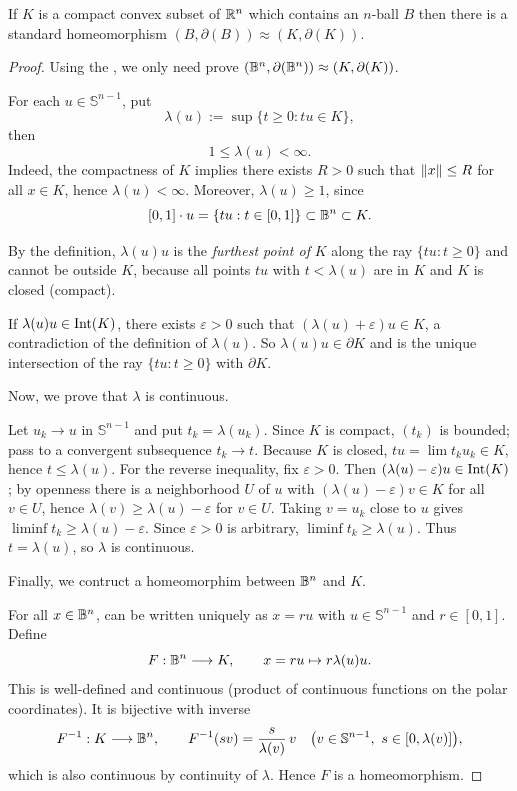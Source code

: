 \begin{proposition}\label{prop:convex-standard}
    If $K$ is a compact convex subset of $\mathbb{R}^n$ which contains an $n$-ball $B$ then there is a standard homeomorphism $(B,\partial(B)) \approx (K,\partial(K))$. 
\end{proposition}
\begin{proof}
    Using the , we only need prove $(\mathbb{B}^n,\partial(\mathbb{B}^n)) \approx (K,\partial(K))$.

    For each $u\in\mathbb{S}^{n-1}$, put
    \[
        \lambda(u) :=\sup\{ t\ge 0 : tu\in K\},
    \]
    then 
    \[1 \leq \lambda(u) < \infty.\] 
    Indeed, the compactness of $K$ implies there exists  $R>0$ such that $\lVert x\rVert\leq R$ for all $x\in K$, hence $\lambda(u) <\infty$. Moreover, $\lambda(u)\ge 1$, since
    \[[0,1]\cdot u = \{tu: t\in [0,1]\}\subset \mathbb{B}^n \subset K.\]

    By the definition, $\lambda(u)u$ is the \textit{furthest point of} $K$ along the ray $\{tu:t\geq 0\}$ and cannot be outside $K$, because all points $tu$ with $t < \lambda(u)$ are in $K$ and $K$ is closed (compact). 
    
    If $\lambda(u)u \in \operatorname{Int}(K)$, there exists $\varepsilon > 0$ such that $(\lambda(u) + \varepsilon)u \in K$, a contradiction of the definition of $\lambda(u)$. So $\lambda(u)u \in \partial K$ and is the unique intersection of the ray $\{t u:t\ge 0\}$ with $\partial K$.

    Now, we prove that $\lambda$ is continuous. 
    
    Let $u_k\to u$ in $\mathbb{S}^{n-1}$ and put $t_k=\lambda(u_k)$.
    Since $K$ is compact, $(t_k)$ is bounded; pass to a convergent subsequence
    $t_k\to t$. Because $K$ is closed, $t u=\lim t_k u_k\in K$, hence $t\le \lambda(u)$.
    For the reverse inequality, fix $\varepsilon>0$. Then
    $(\lambda(u)-\varepsilon)u \in \operatorname{Int}(K)$; by openness there is a neighborhood
    $U$ of $u$ with $(\lambda(u)-\varepsilon) v\in K$ for all $v\in U$, hence
    $\lambda(v)\ge \lambda(u)-\varepsilon$ for $v\in U$. Taking $v=u_k$ close to $u$ gives
    $\liminf t_k\ge \lambda(u)-\varepsilon$. Since $\varepsilon>0$ is arbitrary,
    $\liminf t_k\ge \lambda(u)$. Thus $t=\lambda(u)$, so $\lambda$ is continuous.
    
    Finally, we contruct a homeomorphim between $\mathbb{B}^n$ and $K$. 
    
    For all $x\in\mathbb{B}^n$, can be written uniquely as $x=ru$ with $u\in\mathbb{S}^{n-1}$ and
    $r\in[0,1]$. Define
    \[
        F:\mathbb{B}^n\longrightarrow K,\qquad x= r u \mapsto r\lambda(u)u.
    \]
    This is well-defined and continuous (product of continuous functions on the
    polar coordinates). It is bijective with inverse
    \[
        F^{-1}:K\longrightarrow \B^n,\qquad 
        F^{-1}(s v)= \dfrac{s}{\lambda(v)}\,v\quad\bigl(v\in\mathbb{S}^{n-1},\ s\in[0,\lambda(v)]\bigr),
    \]
    which is also continuous by continuity of $\lambda$. Hence $F$ is a homeomorphism.
    

\end{proof}
